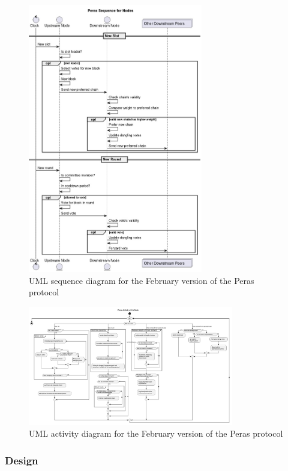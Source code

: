 \documentclass[10pt]{article}
\begin{document}
\begin{figure}
\centering
\includegraphics[width=0.68\textwidth]{../diagrams/sim-expts/peras-sequence.jpg}
\caption{UML sequence diagram for the February version of the Peras
protocol}
\end{figure}

\begin{figure}
\centering
\includegraphics[width=0.80\textwidth]{../diagrams/sim-expts/peras-activity.jpg}
\caption{UML activity diagram for the February version of the Peras
protocol}
\end{figure}

\subsubsection{Design}\label{design}
\end{document}
